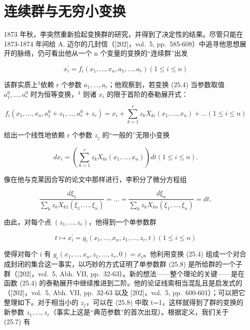 \section{连续群与无穷小变换}

1873 年秋，李突然重新拾起变换群的研究，并得到了决定性的结果。尽管只能在 1873-1874 年间给 A. 迈尔的几封信（{[}202{]}，vol.~5, pp.~585-608）中追寻他思想展开的脉络，仍可看出他从一个 n 个变量的变换的“连续群”出发

\[
x _ {i} ^ {\prime} = f _ {i} (x _ {1}, \dots , x _ {n}, a _ {1}, \dots , a _ {r}) (1 \leq i \leq n)\tag{25.4}
\]

该群实质上\(^{3}\)依赖 r 个参数 \(a_{1},\ldots,a_{r}\)；他观察到，若变换 (25.4) 当参数取值 \(a_{1}^{0},\ldots,a_{r}^{0}\) 时为恒等变换，\(^{4}\) 则诸 \(x_{i}\) 的限于首阶的泰勒展开式：

\[
f _ {i} \left(x _ {1}, \dots , x _ {n}, a _ {1} ^ {0} + z _ {1}, \dots , a _ {r} ^ {0} + z _ {r}\right) = x _ {i} + \sum_ {k = 1} ^ {r} z _ {k} X _ {k i} \left(x _ {1}, \dots , x _ {n}\right) + \dots (1 \leq i \leq n)\tag{25.5}
\]

给出一个线性地依赖 r 个参数 \(z_{j}\) 的“一般的”无限小变换

\[
d x _ {i} = \left(\sum_ {k = 1} ^ {r} z _ {k} X _ {k i} (x _ {1}, \dots , x _ {n})\right) d t (1 \leq i \leq n).\tag{25.6}
\]

像在他与克莱因合写的论文中那样进行，李积分了微分方程组

\[
\frac {d \xi_ {1}}{\sum_ {k} z _ {k} X _ {k 1} (\xi_ {1} , \dots , \xi_ {n})} = \dots = \frac {d \xi_ {n}}{\sum_ {k} z _ {k} X _ {k n} (\xi_ {1} , \dots , \xi_ {n})} = d t,\tag{25.7}
\]

由此，对每个点 \((z_{1},\ldots,z_{r})\)，他得到一个单参数群

\[
t \mapsto x _ {i} ^ {\prime} = g _ {i} (x _ {1}, \dots , x _ {n}, z _ {1}, \dots , z _ {r}, t) (1 \leq i \leq n)\tag{25.8}
\]

使得对每个 i 有 \(g_{i}(x_{1},\ldots,x_{n},z_{1},\ldots,z_{r},0)=x_{i}\)。他利用变换 (25.4) 组成一个对合成封闭的集合这一事实，以巧妙的方式证明了单参数群 (25.8) 是所给群的一个子群（{[}202{]}，vol.~5, Abh. VII, pp.~32-63）。新的想法——整个理论的关键——是在函数 (25.4) 的泰勒展开中继续推进到二阶。他的论证线索相当混乱且是启发式的（{[}202{]}，vol.~5, Abh. VII, pp.~32-63 以及 {[}202{]}，vol.~5, pp.~600-601）；可以把它整理如下。对于相当小的 \(z_{j}\)，可以在 (25.8) 中取 t=1，这样就得到了群的变换的新参数 \(z_{1},\ldots,z_{r}\)（事实上这是“典范参数”的首次出现）。根据定义，我们关于 (25.7) 有

